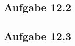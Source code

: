 \documentclass{standalone}
\begin{document}
\subsection{Aufgabe 12.2}


\subsection{Aufgabe 12.3}
\end{document}
